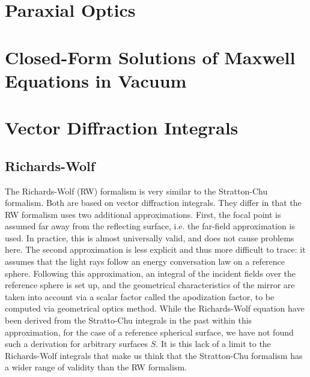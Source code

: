 \documentclass[11pt,SymmetricalJury]{inrsthesis/inrsthesis}
\begin{document}
\section{Paraxial Optics}


\section{Closed-Form Solutions of Maxwell Equations in Vacuum}



\section{Vector Diffraction Integrals}

\subsection{Richards-Wolf}

The Richards-Wolf (RW) formalism is very similar to the Stratton-Chu formalism.
Both are based on vector diffraction integrals. They differ in that the RW
formalism uses two additional approximations. First, the focal point is assumed
far away from the reflecting surface, i.e. the far-field approximation is used.
In practice, this is almost universally valid, and does not cause problems here.
The second approximation is less explicit and thus more difficult to trace: it
assumes that the light rays follow an energy conversation law on a reference
sphere. Following this approximation, an integral of the incident fields over
the reference sphere is set up, and the geometrical characteristics of the
mirror are taken into account via a scalar factor called the apodization factor,
to be computed via geometrical optics method. While the Richards-Wolf equation
have been derived from the Stratto-Chu integrals in the past \cite{Sheppard1977}
within this approximation, for the case of a reference spherical surface, we
have not found such a derivation for arbitrary surfaces $S$. It is this lack of
a limit to the Richards-Wolf integrals that make us think that the Stratton-Chu
formalism has a wider range of validity than the RW formalism.
\end{document}
